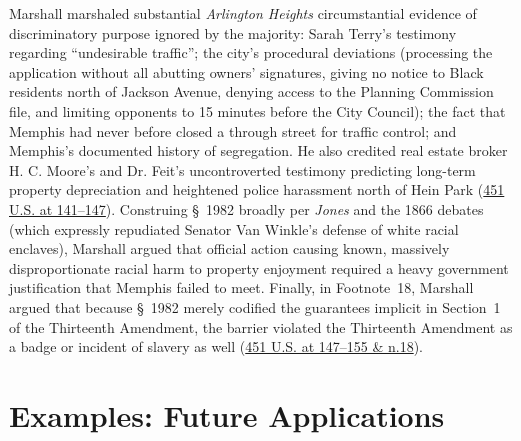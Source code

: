 \documentclass[12pt]{article}
\begin{document}
Marshall marshaled substantial \textit{Arlington Heights} circumstantial evidence of discriminatory purpose ignored by the majority: Sarah Terry's testimony regarding ``undesirable traffic''; the city's procedural deviations (processing the application without all abutting owners' signatures, giving no notice to Black residents north of Jackson Avenue, denying access to the Planning Commission file, and limiting opponents to 15 minutes before the City Council); the fact that Memphis had never before closed a through street for traffic control; and Memphis's documented history of segregation. He also credited real estate broker H. C. Moore's and Dr. Feit's uncontroverted testimony predicting long-term property depreciation and heightened police harassment north of Hein Park (\href{https://supreme.justia.com/cases/federal/us/451/100/}{451 U.S. at 141--147}). Construing \S~1982 broadly per \textit{Jones} and the 1866 debates (which expressly repudiated Senator Van Winkle's defense of white racial enclaves), Marshall argued that official action causing known, massively disproportionate racial harm to property enjoyment required a heavy government justification that Memphis failed to meet. Finally, in Footnote~18, Marshall argued that because \S~1982 merely codified the guarantees implicit in Section~1 of the Thirteenth Amendment, the barrier violated the Thirteenth Amendment as a badge or incident of slavery as well (\href{https://supreme.justia.com/cases/federal/us/451/100/}{451 U.S. at 147--155 \& n.18}).

\section{Examples: Future Applications}
\end{document}
